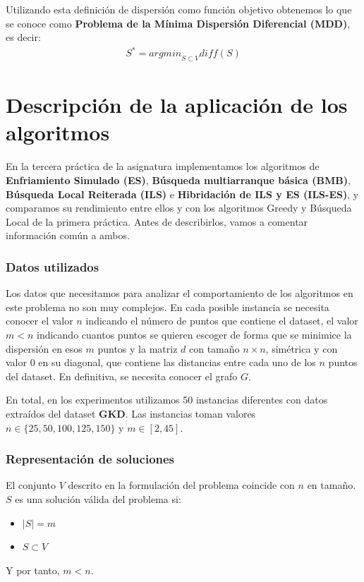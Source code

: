 Utilizando esta definición de dispersión como función objetivo obtenemos lo que se conoce como \textbf{Problema de la Mínima Dispersión Diferencial (MDD)}, es decir: 
\begin{align*}
    S^{*} = {arg min}_{S \subset V} diff(S)
\end{align*}


\part{Descripción de la aplicación de los algoritmos}
En la tercera práctica de la asignatura implementamos los algoritmos de \textbf{Enfriamiento Simulado (ES)}, \textbf{Búsqueda multiarranque básica (BMB)}, \textbf{Búsqueda Local Reiterada (ILS)} e \textbf{Hibridación de ILS y ES (ILS-ES)}, y comparamos su rendimiento entre ellos y con los algoritmos Greedy y Búsqueda Local de la primera práctica. Antes de describirlos, vamos a comentar información común a ambos.


\section{Datos utilizados}
Los datos que necesitamos para analizar el comportamiento de los algoritmos en este problema no son muy complejos. En cada posible instancia se necesita conocer el valor $n$ indicando el número de puntos que contiene el dataset, el valor $m < n$ indicando cuantos puntos se quieren escoger de forma que se minimice la dispersión en esos $m$ puntos y la matriz $d$ con tamaño $n \times n$, simétrica y con valor 0 en su diagonal, que contiene las distancias entre cada uno de los $n$ puntos del dataset. En definitiva, se necesita conocer el grafo $G$.

En total, en los experimentos utilizamos 50 instancias diferentes con datos extraídos del dataset \textbf{GKD}. Las instancias toman valores $n \in \{25,50,100,125,150\}$ y $m \in [2,45]$.


\section{Representación de soluciones}

El conjunto $V$ descrito en la formulación del problema coincide con $n$ en tamaño. $S$ es una solución válida del problema si:
\begin{itemize}
    \item $|S| = m$
    \item $S \subset V$
\end{itemize}
Y por tanto, $m < n$.

